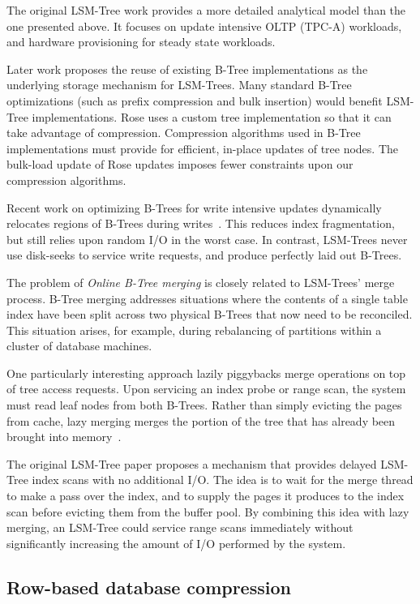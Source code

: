 \documentclass{vldb}
\newcommand{\rows}{Rose\xspace}
\begin{document}
The original LSM-Tree work\cite{lsm} provides a more detailed
analytical model than the one presented above.  It focuses on update
intensive OLTP (TPC-A) workloads, and hardware provisioning for steady
state workloads.

Later work proposes the reuse of existing B-Tree implementations as
the underlying storage mechanism for LSM-Trees\cite{cidrPartitionedBTree}.  Many
standard B-Tree optimizations (such as prefix compression and bulk insertion)
would benefit LSM-Tree implementations.  \rows uses a custom tree
implementation so that it can take advantage of compression.
Compression algorithms used in B-Tree implementations must provide for
efficient, in-place updates of tree nodes.  The bulk-load update of
\rows updates imposes fewer constraints upon our compression
algorithms.

Recent work on optimizing B-Trees for write intensive updates dynamically
relocates regions of B-Trees during
writes~\cite{bTreeHighUpdateRates}.  This reduces index fragmentation,
but still relies upon random I/O in the worst case.  In contrast,
LSM-Trees never use disk-seeks to service write requests, and produce
perfectly laid out B-Trees.

The problem of {\em Online B-Tree merging} is closely related to
LSM-Trees' merge process.  B-Tree merging addresses situations where
the contents of a single table index have been split across two
physical B-Trees that now need to be reconciled.  This situation
arises, for example, during rebalancing of partitions within a cluster
of database machines.

One particularly interesting approach lazily piggybacks merge
operations on top of tree access requests.  Upon servicing an index
probe or range scan, the system must read leaf nodes from both B-Trees.
Rather than simply evicting the pages from cache, lazy merging merges
the portion of the tree that has already been brought into
memory~\cite{onlineMerging}.

The original LSM-Tree paper proposes a mechanism that provides delayed
LSM-Tree index scans with no additional I/O.  The idea is to wait for
the merge thread to make a pass over the index, and to supply the
pages it produces to the index scan before evicting them from the
buffer pool.
By combining this idea with lazy merging, an LSM-Tree could service
range scans immediately without significantly increasing the amount of
I/O performed by the system.

\subsection{Row-based database compression}
\end{document}
